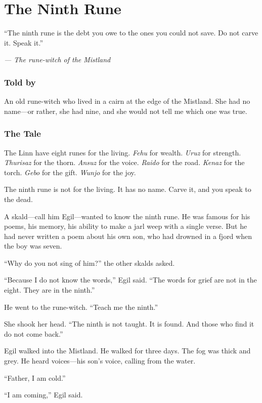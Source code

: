 \documentclass[9pt,a5paper]{extbook}
\begin{document}
\clearpage

\chapter{The Ninth Rune}

\epigraph{``The ninth rune is the debt you owe to the ones you could not save. Do not carve it. Speak it.''}{\textit{--- The rune-witch of the Mistland}}

\subsection*{Told by}

An old rune-witch who lived in a cairn at the edge of the Mistland. She had no name---or rather, she had nine, and she would not tell me which one was true.

\subsection*{The Tale}

The Linn have eight runes for the living. \textit{Fehu} for wealth. \textit{Uruz} for strength. \textit{Thurisaz} for the thorn. \textit{Ansuz} for the voice. \textit{Raido} for the road. \textit{Kenaz} for the torch. \textit{Gebo} for the gift. \textit{Wunjo} for the joy.

The ninth rune is not for the living. It has no name. Carve it, and you speak to the dead.

A skald---call him Egil---wanted to know the ninth rune. He was famous for his poems, his memory, his ability to make a jarl weep with a single verse. But he had never written a poem about his own son, who had drowned in a fjord when the boy was seven.

``Why do you not sing of him?'' the other skalds asked.

``Because I do not know the words,'' Egil said. ``The words for grief are not in the eight. They are in the ninth.''

He went to the rune-witch. ``Teach me the ninth.''

She shook her head. ``The ninth is not taught. It is found. And those who find it do not come back.''

Egil walked into the Mistland. He walked for three days. The fog was thick and grey. He heard voices---his son's voice, calling from the water.

``Father, I am cold.''

``I am coming,'' Egil said.
\end{document}

